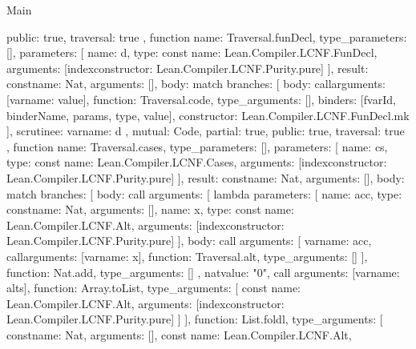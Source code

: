 \begin{lexlean}{Main}
\begin{toolingmodule}
{{      public: true,
      traversal: true
    },
    function{
      name: Traversal.funDecl,
      type_parameters: [],
      parameters: [
        {
          name: d,
          type: const{
            name: Lean.Compiler.LCNF.FunDecl,
            arguments: [index{constructor: Lean.Compiler.LCNF.Purity.pure}]
          }
        }
      ],
      result: const{name: Nat, arguments: []},
      body: match{
        branches: [
          {
            body: call{arguments: [var{name: value}], function: Traversal.code, type_arguments: []},
            binders: [fvarId, binderName, params, type, value],
            constructor: Lean.Compiler.LCNF.FunDecl.mk
          }
        ],
        scrutinee: var{name: d}
      },
      mutual: Code,
      partial: true,
      public: true,
      traversal: true
    },
    function{
      name: Traversal.cases,
      type_parameters: [],
      parameters: [
        {
          name: cs,
          type: const{
            name: Lean.Compiler.LCNF.Cases,
            arguments: [index{constructor: Lean.Compiler.LCNF.Purity.pure}]
          }
        }
      ],
      result: const{name: Nat, arguments: []},
      body: match{
        branches: [
          {
            body: call{
              arguments: [
                lambda{
                  parameters: [
                    {name: acc, type: const{name: Nat, arguments: []}},
                    {
                      name: x,
                      type: const{
                        name: Lean.Compiler.LCNF.Alt,
                        arguments: [index{constructor: Lean.Compiler.LCNF.Purity.pure}]
                      }
                    }
                  ],
                  body: call{
                    arguments: [
                      var{name: acc},
                      call{arguments: [var{name: x}], function: Traversal.alt, type_arguments: []}
                    ],
                    function: Nat.add,
                    type_arguments: []
                  }
                },
                nat{value: "0"},
                call{
                  arguments: [var{name: alts}],
                  function: Array.toList,
                  type_arguments: [
                    const{
                      name: Lean.Compiler.LCNF.Alt,
                      arguments: [index{constructor: Lean.Compiler.LCNF.Purity.pure}]
                    }
                  ]
                }
              ],
              function: List.foldl,
              type_arguments: [
                const{name: Nat, arguments: []},
                const{
                  name: Lean.Compiler.LCNF.Alt,
}}}}}}
\end{toolingmodule}
\end{lexlean}
